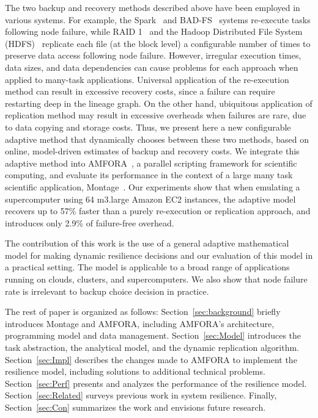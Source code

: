 \documentclass{sig-alternate}
\newcommand{\zhaonote}[1]{{\textcolor{cyan}    { ***Zhao:      #1 }}}
\newcommand{\kylenote}[1]{{\textcolor{orange}    { ***Kyle:      #1 }}}
\newcommand{\zhaonote}[1]{}
\newcommand{\kylenote}[1]{}
\begin{document}
The two backup and recovery methods described above have been employed in various systems. For example,
the Spark~\cite{RDD2012} and BAD-FS~\cite{badfs2004} systems re-execute tasks following node failure,
while RAID 1~\cite{raid1988} and the Hadoop Distributed File System (HDFS)~\cite{HDFS} replicate each file (at the block level) a configurable number of times to preserve data access following node failure.
However, irregular execution times, data sizes, and data dependencies can cause problems for each approach when applied to many-task applications. 
Universal application of the re-execution method can result in excessive recovery costs, since a failure can 
require restarting deep in the lineage graph.
On the other hand, ubiquitous application of replication method may result in excessive overheads when failures are rare, due to data copying and storage costs.
Thus, we present here a new configurable adaptive method that dynamically chooses between these two methods,
based on online, model-driven estimates of backup and recovery costs. We integrate this adaptive method into
AMFORA~\cite{AME, AMFS2013},
a parallel scripting framework for scientific computing, and evaluate its performance in the context of a large many task scientific application, Montage~\cite{montage2, montage1}. 
Our experiments show that when emulating a supercomputer using 64 m3.large Amazon EC2 instances, the adaptive model recovers up to 57\% faster than a purely re-execution or replication approach, and introduces only 2.9\% of failure-free overhead. %

The contribution of this work is the use of a general adaptive mathematical model for making dynamic resilience %
decisions and our evaluation of this model in a practical setting.
The model is applicable to a broad range of applications running on clouds, clusters, and supercomputers. We also show that node failure rate is irrelevant to backup choice decision in practice.

The rest of paper is organized as follows:
Section~\ref{sec:background} briefly introduces Montage and AMFORA, including AMFORA's architecture, programming model and data management.
Section~\ref{sec:Model} introduces the task abstraction, the analytical model, and the dynamic replication algorithm. 
Section~\ref{sec:Impl} describes the changes made to AMFORA 
to implement the resilience model, including solutions to additional technical problems. 
Section~\ref{sec:Perf} presents and analyzes the performance of the resilience model.  
Section~\ref{sec:Related} surveys previous work in system resilience.
Finally, Section~\ref{sec:Con} summarizes the work and envisions future research.
\end{document}
